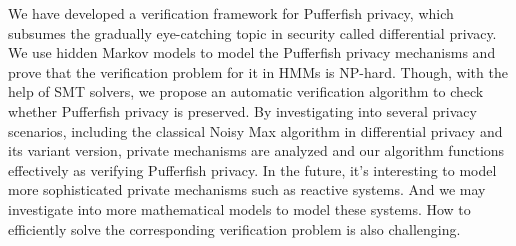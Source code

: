 
We have developed a verification framework for
Pufferfish privacy, which subsumes
the gradually eye-catching topic in security called differential privacy.
We use hidden Markov models to model the Pufferfish privacy mechanisms and
prove that the verification problem for it in HMMs is NP-hard.
Though, with the help of SMT solvers,
we propose an automatic verification algorithm
to check whether Pufferfish privacy is preserved.
By investigating into several privacy scenarios, including the
classical Noisy Max algorithm in differential privacy and its variant version,
private mechanisms are analyzed and our algorithm
functions effectively as verifying Pufferfish privacy.
In the future, it's interesting to model more sophisticated
private mechanisms such as reactive systems. And we may
investigate into more mathematical models to model these systems.
How to efficiently solve the corresponding verification problem is also challenging.

